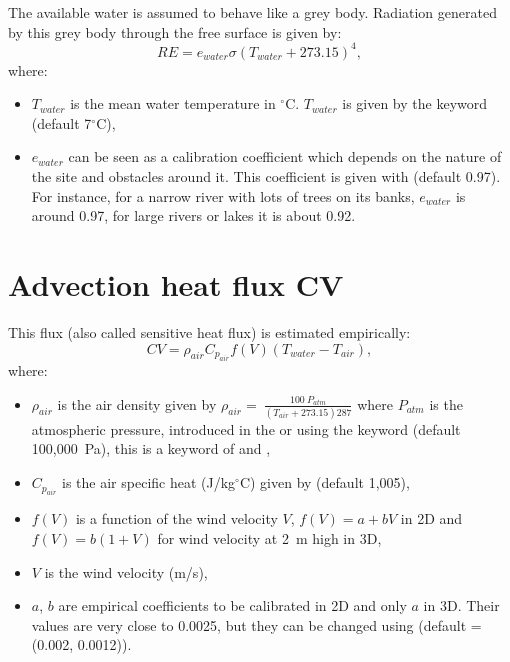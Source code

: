 The available water is assumed to behave like a grey body.
Radiation generated by this grey body through the free surface is given by:
\begin{equation*}
RE = e_{water}\sigma\left(T_{water}+273.15 \right)^4,
\end{equation*}
where:
\begin{itemize}
\item $T_{water}$ is the mean water temperature in ${}^\circ$C.
$T_{water}$ is given by the keyword  (default 7${}^\circ$C),
\item $e_{water}$ can be seen as a calibration coefficient which depends on the nature
of the site and obstacles around it.
This coefficient is given with
 (default 0.97).
For instance, for a narrow river with lots of trees on its banks,
$e_{water}$ is around 0.97, for large rivers or lakes it is about 0.92.
\end{itemize}


\section{Advection heat flux CV}

This flux (also called sensitive heat flux) is estimated empirically:
\begin{equation*}
CV=\rho_{air}C_{p_{air}}f(V)\left(T_{water}-T_{air} \right),
\end{equation*}
where:
\begin{itemize}
  \item $\rho_{air}$ is the air density given by
${\rho }_{air}=\ \frac{100\ P_{atm}}{\left(T_{air}+273.15\right)287}$
where $P_{atm}$ is the atmospheric pressure,
introduced in the  or using the keyword
 (default 100,000~Pa),
this is a keyword of  and ,
\item $C_{p_{air}}$ is the air specific heat (J/kg${}^\circ$C)
  given by  (default 1,005),
\item $f(V)$ is a function of the wind velocity $V$,
  $f(V) = a+bV$ in 2D and
  $f(V) = b(1+V)$ for wind velocity at 2~m high in 3D,
\item $V$ is the wind velocity (m/s),
\item $a$, $b$ are empirical coefficients to be calibrated in 2D and only $a$ in 3D.
Their values are very close to 0.0025, but they can be changed
using  (default = (0.002, 0.0012)).
\end{itemize}

